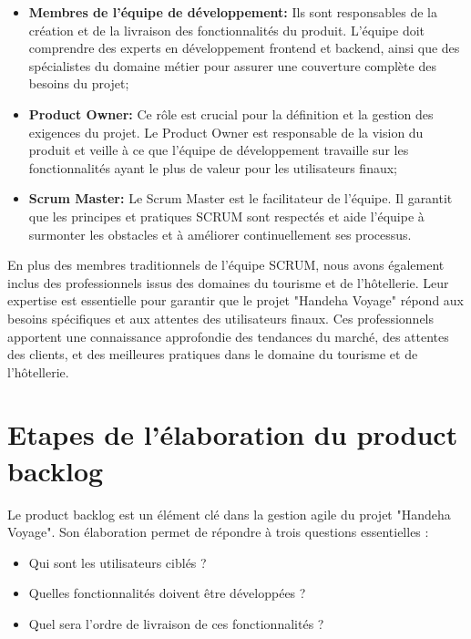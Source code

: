 \documentclass[12pt]{report}
\begin{document}
				\begin{itemize}
					\item \textbf{Membres de l'équipe de développement:} Ils sont responsables de la création et de la livraison des fonctionnalités du produit. L'équipe doit comprendre des experts en développement frontend et backend, ainsi que des spécialistes du domaine métier pour assurer une couverture complète des besoins du projet;
					\item \textbf{Product Owner:} Ce rôle est crucial pour la définition et la gestion des exigences du projet. Le Product Owner est responsable de la vision du produit et veille à ce que l'équipe de développement travaille sur les fonctionnalités ayant le plus de valeur pour les utilisateurs finaux;
					\item \textbf{Scrum Master:} Le Scrum Master est le facilitateur de l'équipe. Il garantit que les principes et pratiques SCRUM sont respectés et aide l'équipe à surmonter les obstacles et à améliorer continuellement ses processus.
				\end{itemize}
				
				En plus des membres traditionnels de l'équipe SCRUM, nous avons également inclus des professionnels issus des domaines du tourisme et de l'hôtellerie. Leur expertise est essentielle pour garantir que le projet "Handeha Voyage" répond aux besoins spécifiques et aux attentes des utilisateurs finaux. Ces professionnels apportent une connaissance approfondie des tendances du marché, des attentes des clients, et des meilleures pratiques dans le domaine du tourisme et de l'hôtellerie.

				\section{Etapes de l’élaboration du product backlog}

				\hspace{15pt} Le product backlog est un élément clé dans la gestion agile du projet "Handeha Voyage". Son élaboration permet de répondre à trois questions essentielles :

				\begin{itemize}
					\item Qui sont les utilisateurs ciblés ?
					\item Quelles fonctionnalités doivent être développées ?
					\item Quel sera l'ordre de livraison de ces fonctionnalités ?
				\end{itemize}
\end{document}
